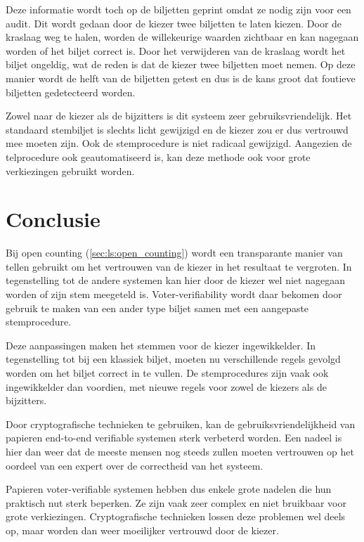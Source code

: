 \npar Deze informatie wordt toch op de biljetten geprint omdat ze nodig zijn voor een audit. Dit wordt gedaan door de kiezer twee biljetten te laten kiezen. Door de kraslaag weg te halen, worden de willekeurige waarden zichtbaar en kan nagegaan worden of het biljet correct is. Door het verwijderen van de kraslaag wordt het biljet ongeldig, wat de reden is dat de kiezer twee biljetten moet nemen. Op deze manier wordt de helft van de biljetten getest en dus is de kans groot dat foutieve biljetten gedetecteerd worden.

\npar Zowel naar de kiezer als de bijzitters is dit systeem zeer gebruiksvriendelijk. Het standaard stembiljet is slechts licht gewijzigd en de kiezer zou er dus vertrouwd mee moeten zijn. Ook de stemprocedure is niet radicaal gewijzigd. Aangezien de telprocedure ook geautomatiseerd is, kan deze methode ook voor grote verkiezingen gebruikt worden.

\section{Conclusie}

Bij open counting (\ref{sec:ls:open_counting}) wordt een transparante manier van tellen gebruikt om het vertrouwen van de kiezer in het resultaat te vergroten. In tegenstelling tot de andere systemen kan hier door de kiezer wel niet nagegaan worden of zijn stem meegeteld is. Voter-verifiability wordt daar bekomen door gebruik te maken van een ander type biljet samen met een aangepaste stemprocedure.

\npar Deze aanpassingen maken het stemmen voor de kiezer ingewikkelder. In tegenstelling tot bij een klassiek biljet, moeten nu verschillende regels gevolgd worden om het biljet correct in te vullen. De stemprocedures zijn vaak ook ingewikkelder dan voordien, met nieuwe regels voor zowel de kiezers als de bijzitters.

\npar Door cryptografische technieken te gebruiken, kan de gebruiksvriendelijkheid van papieren end-to-end verifiable systemen sterk verbeterd worden. Een nadeel is hier dan weer dat de meeste mensen nog steeds zullen moeten vertrouwen op het oordeel van een expert over de correctheid van het systeem.

\npar Papieren voter-verifiable systemen hebben dus enkele grote nadelen die hun praktisch nut sterk beperken. Ze zijn vaak zeer complex en niet bruikbaar voor grote verkiezingen. Cryptografische technieken lossen deze problemen wel deels op, maar worden dan weer moeilijker vertrouwd door de kiezer.

